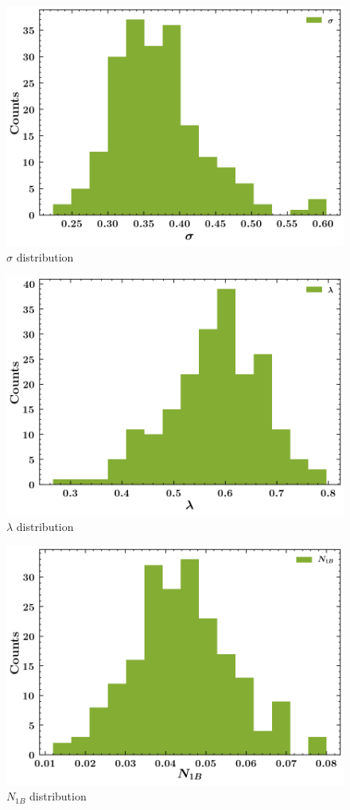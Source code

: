\documentclass[
]{article}
\begin{document}
\begin{figure}
\centering
\includegraphics{pngplots/param3.png}
\caption{\(\sigma\) distribution}
\end{figure}

\begin{figure}
\centering
\includegraphics{pngplots/param4.png}
\caption{\(\lambda\) distribution}
\end{figure}

\begin{figure}
\centering
\includegraphics{pngplots/param5.png}
\caption{\(N_{1B}\) distribution}
\end{figure}
\end{document}
